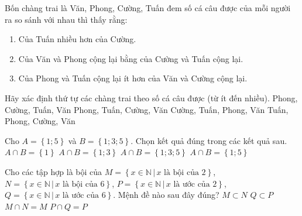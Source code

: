 \begin{ex}
Bốn chàng trai là Văn, Phong, Cường, Tuấn đem số cá câu được của mỗi người ra so sánh với nhau thì thấy rằng:
\begin{enumerate} 
\item Của Tuấn nhiều hơn của Cường.
\item Của Văn và Phong cộng lại bằng của Cường và Tuấn cộng lại.
\item Của Phong và Tuấn cộng lại ít hơn của Văn và Cường cộng lại.
\end{enumerate}
Hãy xác định thứ tự các chàng trai theo số cá câu được (từ ít đến nhiều).
\choice
{\True Phong, Cường, Tuấn, Văn}
{Phong, Tuấn, Cường, Văn}
{Cường, Tuấn, Phong, Văn}
{Tuấn, Phong, Cường, Văn}
\end{ex}

\begin{ex}%
	Cho $ A=\left\{1;5\right\}$ và $ B=\left\{1;3;5\right\}.$ Chọn kết quả đúng trong các kết quả sau.
	\choice
	{$ A\cap B=\left\{ 1\right\}$}
	{$ A\cap B=\left\{1;3\right\}$}
	{$ A\cap B=\left\{1;3;5\right\}$}
	{\True $ A\cap B=\left\{1;5\right\}$}
\end{ex}


\begin{ex}%
	Cho các tập hợp là bội của $M=\left\{x\in\mathbb{N}\,|\,x\text{ là bội của $2$} \right\}$, $N=\left\{x\in\mathbb{N}\,|\,x\text{ là bội của $6$} \right\}$,\break
	$P=\left\{x\in\mathbb{N}\,|\,x\text{ là ước của $2$} \right\}$, $Q=\left\{x\in\mathbb{N}\,|\,x\text{ là ước của $6$} \right\}$. Mệnh đề nào sau đây đúng?
	\choice
	{$ M\subset N$}
	{$ Q\subset P$}
	{$ M\cap N=M$}
	{\True $ P\cap Q=P$}
\end{ex}

